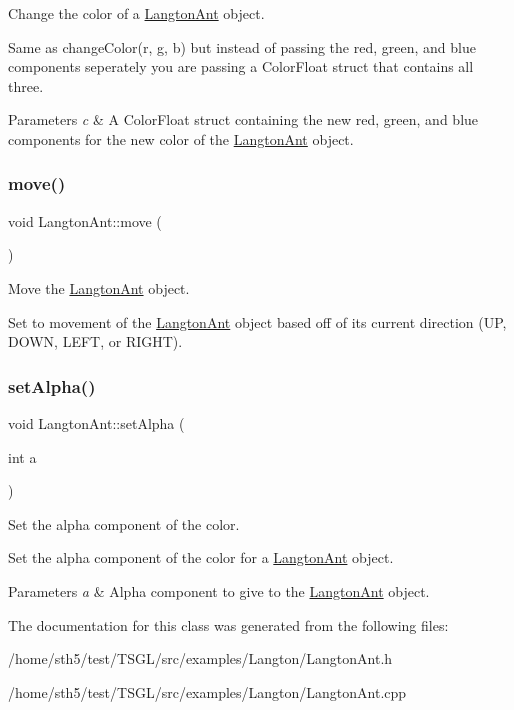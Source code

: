 Change the color of a \hyperlink{class_langton_ant}{Langton\+Ant} object. 

Same as change\+Color(r, g, b) but instead of passing the red, green, and blue components seperately you are passing a Color\+Float struct that contains all three. 
\begin{DoxyParams}{Parameters}
{\em c} & A Color\+Float struct containing the new red, green, and blue components for the new color of the \hyperlink{class_langton_ant}{Langton\+Ant} object. \\
\hline
\end{DoxyParams}
\mbox{\label{class_langton_ant_acf17f14d78270a32b66273d83d8900c1}} 
\subsubsection{\texorpdfstring{move()}{move()}}
{\footnotesize\ttfamily void Langton\+Ant\+::move (\begin{DoxyParamCaption}{ }\end{DoxyParamCaption})}



Move the \hyperlink{class_langton_ant}{Langton\+Ant} object. 

Set to movement of the \hyperlink{class_langton_ant}{Langton\+Ant} object based off of its current direction (UP, D\+O\+WN, L\+E\+FT, or R\+I\+G\+HT). \mbox{\label{class_langton_ant_a5fd5b25e776cfe96abe70300d022e333}} 
\subsubsection{\texorpdfstring{set\+Alpha()}{setAlpha()}}
{\footnotesize\ttfamily void Langton\+Ant\+::set\+Alpha (\begin{DoxyParamCaption}\item[{int}]{a }\end{DoxyParamCaption})}



Set the alpha component of the color. 

Set the alpha component of the color for a \hyperlink{class_langton_ant}{Langton\+Ant} object. 
\begin{DoxyParams}{Parameters}
{\em a} & Alpha component to give to the \hyperlink{class_langton_ant}{Langton\+Ant} object. \\
\hline
\end{DoxyParams}


The documentation for this class was generated from the following files\+:\begin{DoxyCompactItemize}
\item 
/home/sth5/test/\+T\+S\+G\+L/src/examples/\+Langton/Langton\+Ant.\+h\item 
/home/sth5/test/\+T\+S\+G\+L/src/examples/\+Langton/Langton\+Ant.\+cpp\end{DoxyCompactItemize}
